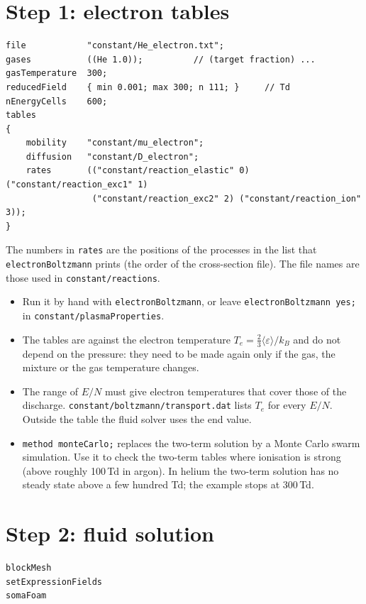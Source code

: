 \documentclass[10pt,a4paper]{article}
\newcommand{\kw}[1]{\texttt{#1}}
\begin{document}
\section{Step 1: electron tables}

\begin{lstlisting}
file            "constant/He_electron.txt";
gases           ((He 1.0));          // (target fraction) ...
gasTemperature  300;
reducedField    { min 0.001; max 300; n 111; }     // Td
nEnergyCells    600;
tables
{
    mobility    "constant/mu_electron";
    diffusion   "constant/D_electron";
    rates       (("constant/reaction_elastic" 0) ("constant/reaction_exc1" 1)
                 ("constant/reaction_exc2" 2) ("constant/reaction_ion" 3));
}
\end{lstlisting}

The numbers in \kw{rates} are the positions of the processes in the list that
\kw{electronBoltzmann} prints (the order of the cross-section file). The file
names are those used in \kw{constant/reactions}.

\begin{itemize}[leftmargin=1.4em,itemsep=1pt]
\item Run it by hand with \kw{electronBoltzmann}, or leave
  \kw{electronBoltzmann yes;} in \kw{constant/plasmaProperties}.
\item The tables are against the electron temperature
  $T_e=\tfrac23\langle\varepsilon\rangle/k_B$ and do not depend on the
  pressure: they need to be made again only if the gas, the mixture or the gas
  temperature changes.
\item The range of $E/N$ must give electron temperatures that cover those of
  the discharge. \kw{constant/boltzmann/transport.dat} lists $T_e$ for every
  $E/N$. Outside the table the fluid solver uses the end value.
\item \kw{method monteCarlo;} replaces the two-term solution by a Monte Carlo
  swarm simulation. Use it to check the two-term tables where ionisation is
  strong (above roughly 100\,Td in argon). In helium the two-term solution
  has no steady state above a few hundred Td; the example stops at 300\,Td.
\end{itemize}

\section{Step 2: fluid solution}

\begin{lstlisting}
blockMesh
setExpressionFields
somaFoam
\end{lstlisting}
\end{document}
